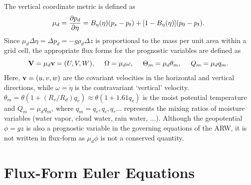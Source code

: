 %
The vertical coordinate metric is defined as 
%
\begin{equation}
\mu_d= {\partial p_d\over\partial\eta} = B_\eta(\eta)(p_s-p_t) +[1-B_\eta(\eta)](p_0-p_t). \label{mu_def}
\end{equation}
%
Since $\mu_d \Delta\eta=\Delta p_d=-g\rho_d \Delta z$ is proportional to the mass per unit area within a
grid cell, the appropriate flux forms for the prognostic  variables are defined as
%
\begin{equation}
 \hbox{\bf V} = \mu_d \hbox{\bf  v} =(U,V,W), ~~~~ \Omega = \mu_d\omega, ~~~~ 
     \Theta_m = \mu_d \theta_m, ~~~~ Q_m = \mu_d q_m.                                      
\end{equation}
%
\noindent
Here, ${\hbox{\bf v}} = (u,v,w)$ are the covariant velocities in the
horizontal and vertical directions, while 
$\omega = \dot\eta$ is the contravariant `vertical' velocity.  $\theta_m = \theta (1 + (R_v/R_d) q_v) 
\approx \theta (1 + 1.61 q_v)$ is the moist potential temperature and $Q_m = \mu_d q_m$, where $q_m = q_v, q_c,
q_r ...$ represents the mixing ratios of moisture variables (water vapor, cloud water, rain water, ...).  Although the geopotential $\phi=gz$ is also a prognostic variable in the governing equations of the ARW, it is not written in flux-form as $\mu_d\phi$ is not a conserved quantity. 
 
\section{Flux-Form Euler Equations}

